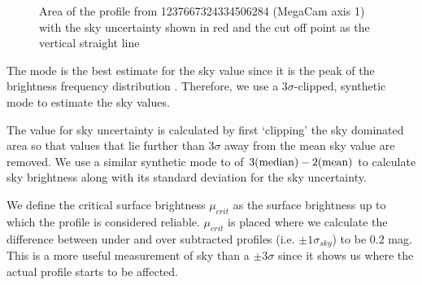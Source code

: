 \begin{figure}[h]
	\centering
	\caption{\footnotesize{Area of the profile from 1237667324334506284 (MegaCam axis 1) with the sky uncertainty shown in red and the cut off point as the vertical straight line}}
\end{figure}

The mode is the best estimate for the sky value since it is the peak of the brightness frequency distribution \citep{bijaoui_sky_1980}. Therefore, we use a $3\sigma$-clipped, synthetic mode to estimate the sky values.

The value for sky uncertainty is calculated by first `clipping' the sky dominated area so that values that lie further than $3\sigma$ away from the mean sky value are removed. We use a similar synthetic mode to \citet{peng_detailed_2010} of $3(\rm{median}) - 2(\rm{mean})$ to calculate sky brightness along with its standard deviation for the sky uncertainty.

We define the critical surface brightness $\mu_{crit}$ as the surface brightness up to which the profile is considered reliable. $\mu_{crit}$ is placed where we calculate the difference between under and over subtracted profiles (i.e. $\pm 1 \sigma_{sky}$) to be 0.2 mag. This is a more useful measurement of sky than a $\pm 3 \sigma$ since it shows us where the actual profile starts to be affected.

